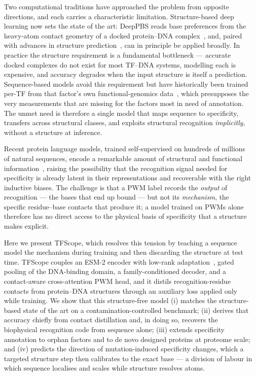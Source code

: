 \documentclass[11pt,letterpaper]{article}
\begin{document}
Two computational traditions have approached the problem from opposite directions, and each
carries a characteristic limitation. Structure-based deep learning now sets the state of the
art: DeepPBS reads base preferences from the heavy-atom contact geometry of a docked
protein--DNA complex~\cite{Mitra2024}, and, paired with advances in structure
prediction~\cite{Jumper2021}, can in principle be applied broadly. In practice the structure
requirement is a fundamental bottleneck --- accurate docked complexes do not exist for most
TF--DNA systems, modelling each is expensive, and accuracy degrades when the input structure is
itself a prediction. Sequence-based models avoid this requirement but have historically been
trained per-TF from that factor's own functional-genomics data~\cite{Alipanahi2015}, which
presupposes the very measurements that are missing for the factors most in need of annotation.
The unmet need is therefore a single model that maps sequence to specificity, transfers across
structural classes, and exploits structural recognition \emph{implicitly}, without a structure
at inference.

Recent protein language models, trained self-supervised on hundreds of millions of natural
sequences, encode a remarkable amount of structural and functional
information~\cite{Lin2023,Elnaggar2022}, raising the possibility that the recognition signal
needed for specificity is already latent in their representations and recoverable with the right
inductive biases. The challenge is that a PWM label records the \emph{output} of recognition ---
the bases that end up bound --- but not its \emph{mechanism}, the specific residue--base contacts
that produce it; a model trained on PWMs alone therefore has no direct access to the physical
basis of specificity that a structure makes explicit.

Here we present TFScope, which resolves this tension by teaching a sequence model the mechanism
during training and then discarding the structure at test time. TFScope couples an ESM-2 encoder
with low-rank adaptation~\cite{Hu2022}, gated pooling of the DNA-binding domain, a
family-conditioned decoder, and a contact-aware cross-attention PWM head, and it distils
recognition-residue contacts from protein--DNA structures through an auxiliary loss applied only
while training. We show that this structure-free model (i) matches the structure-based state of
the art on a contamination-controlled benchmark; (ii) derives that accuracy chiefly from contact
distillation and, in doing so, recovers the biophysical recognition code from sequence alone;
(iii) extends specificity annotation to orphan factors and to de novo designed proteins at
proteome scale; and (iv) predicts the direction of mutation-induced specificity changes, which a
targeted structure step then calibrates to the exact base --- a division of labour in which
sequence localises and scales while structure resolves atoms.
\end{document}
